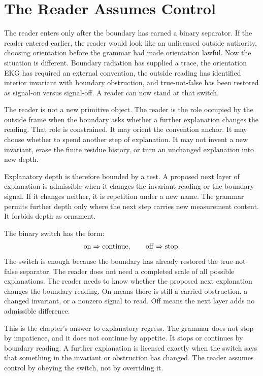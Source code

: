 \section{The Reader Assumes Control}

The reader enters only after the boundary has earned a binary separator. If
the reader entered earlier, the reader would look like an unlicensed outside
authority, choosing orientation before the grammar had made orientation
lawful. Now the situation is different. Boundary radiation has supplied a
trace, the orientation EKG has required an external convention, the outside
reading has identified interior invariant with boundary obstruction, and
true-not-false has been restored as signal-on versus signal-off. A reader can
now stand at that switch.

The reader is not a new primitive object. The reader is the role occupied by
the outside frame when the boundary asks whether a further explanation
changes the reading. That role is constrained. It may orient the convention
anchor. It may choose whether to spend another step of explanation. It may
not invent a new invariant, erase the finite residue history, or turn an
unchanged explanation into new depth.

Explanatory depth is therefore bounded by a test. A proposed next layer of
explanation is admissible when it changes the invariant reading or the
boundary signal. If it changes neither, it is repetition under a new name.
The grammar permits further depth only where the next step carries new
measurement content. It forbids depth as ornament.

The binary switch has the form:
\[
  \mathrm{on} \Rightarrow \hbox{continue},
  \qquad
  \mathrm{off} \Rightarrow \hbox{stop}.
\]
The switch is enough because the boundary has already restored the
true-not-false separator. The reader does not need a completed scale of all
possible explanations. The reader needs to know whether the proposed next
explanation changes the boundary reading. On means there is still a carried
obstruction, a changed invariant, or a nonzero signal to read. Off means the
next layer adds no admissible difference.

This is the chapter's answer to explanatory regress. The grammar does not
stop by impatience, and it does not continue by appetite. It stops or
continues by boundary reading. A further explanation is licensed exactly when
the switch says that something in the invariant or obstruction has changed.
The reader assumes control by obeying the switch, not by overriding it.

